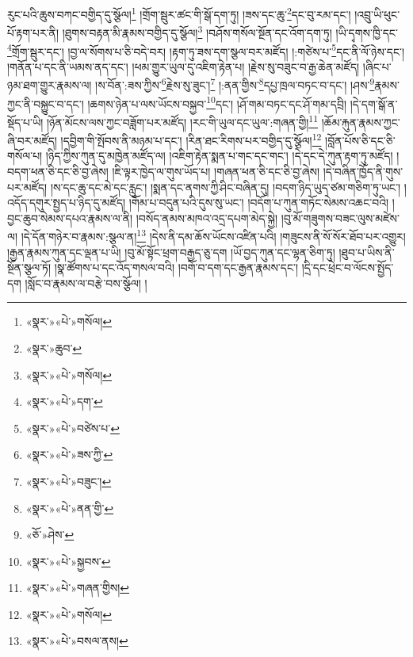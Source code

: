\documentclass[12pt,a4paper]{book}
\begin{document}
རུང་པའི་ཆུས་བཀང་བགྱིད་དུ་སྩོལ།\footnote{«སྣར་»«པེ་»གསོལ།} །གྲོག་སྦུར་ཚང་གི་སྒོ་དག་ཏུ། །ཟས་དང་ཆུ་\footnote{«སྣར་»ཆུབ་}དང་བུ་རམ་དང་། །འབྲུ་ཡི་ཕུང་པོ་རྟག་པར་ནི། །ཐུགས་བརྟན་མི་རྣམས་བགྱིད་དུ་སྩོལ།\footnote{«སྣར་»«པེ་»གསོལ།} །བཤོས་གསོལ་སྔོན་དང་འོག་དག་ཏུ། །ཡི་དྭགས་ཁྱི་དང་\footnote{«སྣར་»«པེ་»དག་}གྲོག་སྦུར་དང་། །བྱ་ལ་སོགས་པ་ཅི་བདེ་བར། །རྟག་ཏུ་ཟས་དག་སྩལ་བར་མཛོད། །:གཙེས་པ་\footnote{«སྣར་»«པེ་»བཙེས་པ་}དང་ནི་ལོ་ཉེས་དང་། །གནོན་པ་དང་ནི་ཡམས་ནད་དང་། །ཕམ་གྱུར་ཡུལ་དུ་འཇིག་རྟེན་པ། །རྗེས་སུ་བཟུང་བ་རྒྱ་ཆེན་མཛོད། །ཞིང་པ་ཉམ་ཐག་གྱུར་རྣམས་ལ། །ས་བོན་:ཟས་ཀྱིས་\footnote{«སྣར་»«པེ་»ཟས་ཀྱི་}རྗེས་སུ་ཟུང་།\footnote{«སྣར་»«པེ་»བཟུང་།} །:ནན་གྱིས་\footnote{«སྣར་»«པེ་»ནན་གྱི་}དཔྱ་ཁྲལ་བཏང་བ་དང་། །ཤས་\footnote{«ཅོ་»ཤེས་}རྣམས་ཀྱང་ནི་བསྐྱུང་བ་དང་། །ཆགས་ཉེན་པ་ལས་ཡོངས་བསྐྱབ་\footnote{«སྣར་»«པེ་»སྐྱབས་}དང་། །ཤོ་གམ་བཏང་དང་ཤོ་གམ་དབྲི། །དེ་དག་སྒོ་ན་སྡོད་པ་ཡི། །ཉོན་མོངས་ལས་ཀྱང་བཟློག་པར་མཛོད། །རང་གི་ཡུལ་དང་ཡུལ་:གཞན་གྱི།\footnote{«སྣར་»«པེ་»གཞན་གྱིས།} །ཆོམ་རྐུན་རྣམས་ཀྱང་ཞི་བར་མཛོད། །དབྱིག་གི་སྤོབས་ནི་མཉམ་པ་དང་། །རིན་ཐང་རིགས་པར་བགྱིད་དུ་སྩོལ།\footnote{«སྣར་»«པེ་»གསོལ།} །བློན་པོས་ཅི་དང་ཅི་གསོལ་པ། །ཉིད་ཀྱིས་ཀུན་དུ་མཁྱེན་མཛོད་ལ། །འཇིག་རྟེན་སྨན་པ་གང་དང་གང་། །དེ་དང་དེ་ཀུན་རྟག་ཏུ་མཛོད། །བདག་ཕན་ཅི་དང་ཅི་བྱ་ཞེས། །ཇི་ལྟར་ཁྱེད་ལ་གུས་ཡོད་པ། །གཞན་ཕན་ཅི་དང་ཅི་བྱ་ཞེས། །དེ་བཞིན་ཁྱོད་ནི་གུས་པར་མཛོད། །ས་དང་ཆུ་དང་མེ་དང་རླུང་། །སྨན་དང་ནགས་ཀྱི་ཤིང་བཞིན་དུ། །བདག་ཉིད་ཡུད་ཙམ་གཅིག་ཏུ་ཡང་། །འདོད་དགུར་སྤྱད་པ་ཉིད་དུ་མཛོད། །གོམ་པ་བདུན་པའི་དུས་སུ་ཡང་། །བདོག་པ་ཀུན་གཏོང་སེམས་འཆང་བའི། །བྱང་ཆུབ་སེམས་དཔའ་རྣམས་ལ་ནི། །བསོད་ནམས་མཁའ་འདྲ་དཔག་མེད་སྐྱེ། །བུ་མོ་གཟུགས་བཟང་ལུས་མཛེས་ལ། །དེ་དོན་གཉེར་བ་རྣམས་:སྩལ་ན།\footnote{«སྣར་»«པེ་»བསལ་ནས།} །དེས་ནི་དམ་ཆོས་ཡོངས་འཛིན་པའི། །གཟུངས་ནི་སོ་སོར་ཐོབ་པར་འགྱུར། །རྒྱན་རྣམས་ཀུན་དང་ལྡན་པ་ཡི། །བུ་མོ་སྟོང་ཕྲག་བརྒྱད་ཅུ་དག །ཡོ་བྱད་ཀུན་དང་ལྷན་ཅིག་ཏུ། །ཐུབ་པ་ཡིས་ནི་སྔོན་སྩལ་ཏོ། །སྣ་ཚོགས་པ་དང་འོད་གསལ་བའི། །བགོ་བ་དག་དང་རྒྱན་རྣམས་དང་། །དྲི་དང་ཕྲེང་བ་ལོངས་སྤྱོད་དག །སློང་བ་རྣམས་ལ་བརྩེ་བས་སྩོལ། །
\end{document}
